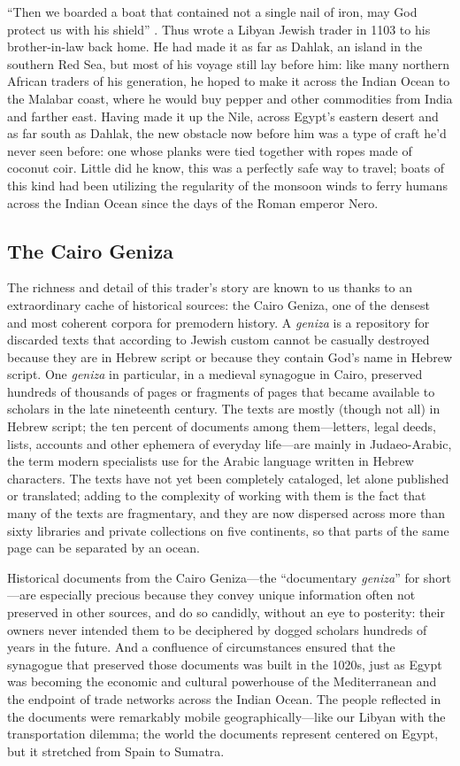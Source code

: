 \documentclass{article}
\begin{document}
“Then we boarded a boat that contained not a single nail of iron, may God protect us with his shield” \autocite{noauthor_letter_1103}. Thus wrote a Libyan Jewish trader in 1103 to his brother-in-law back home. He had made it as far as Dahlak, an island in the southern Red Sea, but most of his voyage still lay before him: like many northern African traders of his generation, he hoped to make it across the Indian Ocean to the Malabar coast, where he would buy pepper and other commodities from India and farther east. Having made it up the Nile, across Egypt’s eastern desert and as far south as Dahlak, the new obstacle now before him was a type of craft he’d never seen before: one whose planks were tied together with ropes made of coconut coir. Little did he know, this was a perfectly safe way to travel; boats of this kind had been utilizing the regularity of the monsoon winds to ferry humans across the Indian Ocean since the days of the Roman emperor Nero.

\subsection{The Cairo Geniza}

The richness and detail of this trader’s story are known to us thanks to an extraordinary cache of historical sources: the Cairo Geniza, one of the densest and most coherent corpora for premodern history. A \textit{geniza} is a repository for discarded texts that according to Jewish custom cannot be casually destroyed because they are in Hebrew script or because they contain God’s name in Hebrew script. One \textit{geniza} in particular, in a medieval synagogue in Cairo, preserved hundreds of thousands of pages or fragments of pages that became available to scholars in the late nineteenth century. The texts are mostly (though not all) in Hebrew script; the ten percent of documents among them—letters, legal deeds, lists, accounts and other ephemera of everyday life—are mainly in Judaeo-Arabic, the term modern specialists use for the Arabic language written in Hebrew characters. The texts have not yet been completely cataloged, let alone published or translated; adding to the complexity of working with them is the fact that many of the texts are fragmentary, and they are now dispersed across more than sixty libraries and private collections on five continents, so that parts of the same page can be separated by an ocean.

Historical documents from the Cairo Geniza—the “documentary \textit{geniza}” for short—are especially precious because they convey unique information often not preserved in other sources, and do so candidly, without an eye to posterity: their owners never intended them to be deciphered by dogged scholars hundreds of years in the future. And a confluence of circumstances ensured that the synagogue that preserved those documents was built in the 1020s, just as Egypt was becoming the economic and cultural powerhouse of the Mediterranean and the endpoint of trade networks across the Indian Ocean. The people reflected in the documents were remarkably mobile geographically—like our Libyan with the transportation dilemma; the world the documents represent centered on Egypt, but it stretched from Spain to Sumatra. 
\end{document}
